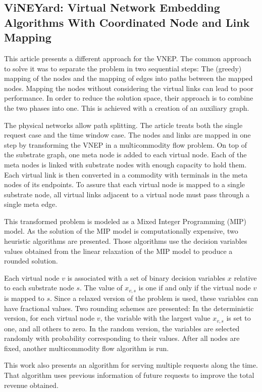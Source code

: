 \subsection{ViNEYard: Virtual Network Embedding Algorithms With Coordinated Node and Link Mapping \cite{Chowdhury:2012}}
This article presents a different approach for the VNEP\@. The common approach to solve it was to separate the problem in two sequential steps: The (greedy) mapping of the nodes and the mapping of edges into paths between the mapped nodes. Mapping the nodes without considering the virtual links can lead to poor performance. In order to reduce the solution space, their approach is to combine the two phases into one. This is achieved with a creation of an auxiliary graph.

The physical networks allow path splitting. The article treats both the single request case and the time window case. The nodes and links are mapped in one step by transforming the VNEP in a multicommodity flow problem. On top of the substrate graph, one meta node is added to each virtual node. Each of the meta nodes is linked with substrate nodes with enough capacity to hold them. Each virtual link is then converted in a commodity with terminals in the meta nodes of its endpoints. To assure that each virtual node is mapped to a single substrate node, all virtual links adjacent to a virtual node must pass through a single meta edge.

This transformed problem is modeled as a Mixed Integer Programming (MIP) model. As the solution of the MIP model is computationally expensive, two heuristic algorithms are presented. Those algorithms use the decision variables values obtained from the linear relaxation of the MIP model to produce a rounded solution.

Each virtual node $v$ is associated with a set of binary decision variables $x$ relative to each substrate node $s$. The value of $x_{v,s}$ is one if and only if the virtual node $v$ is mapped to $s$. Since a relaxed version of the problem is used, these variables can have fractional values. Two rounding schemes are presented: In the deterministic version, for each virtual node $v$, the variable with the largest value $x_{v,s}$ is set to one, and all others to zero. In the random version, the variables are selected randomly with probability corresponding to their values. After all nodes are fixed, another multicommodity flow algorithm is run.

This work also presents an algorithm for serving multiple requests along the time. That algorithm uses previous information of future requests to improve the total revenue obtained.


